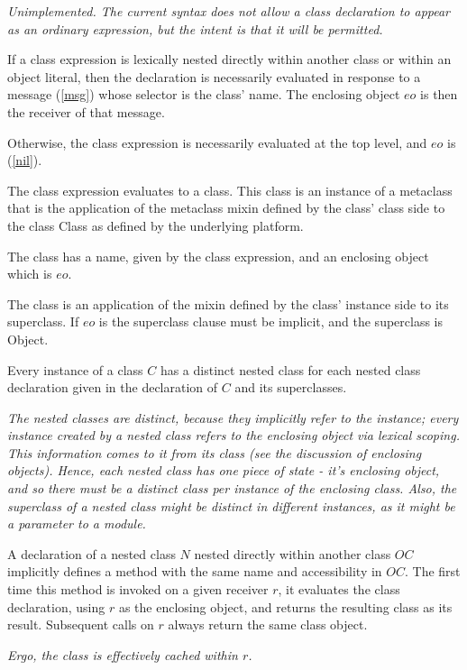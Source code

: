 \documentclass{article}
\newcommand{\code}[1]{{\sf #1}}
\begin{document}
 {\it Unimplemented. The current syntax does not allow a class declaration to appear as an ordinary expression, but the intent is that it will be permitted.
 }
 
If a class expression is lexically nested directly within another class or within an object literal, then the declaration is necessarily evaluated in response to a message (\ref{msg}) whose selector is the class' name. The enclosing object  $eo$ is then the receiver of that message.

Otherwise, the class expression is necessarily evaluated at the top level, and $eo$ is \NIL{}  (\ref{nil}).
 
The class expression evaluates to a class. This class is an instance of a metaclass that is the application of the metaclass mixin defined by the class' class side to the class \code{Class} as defined by the underlying platform. 

The class has a name, given by the  class expression, and an enclosing object which is $eo$. 
 
The class is an application of the mixin defined by the class' instance side to its superclass.
If $eo$ is \NIL{} the superclass clause must be implicit, and the superclass is \code{Object}.

Every instance of a class $C$ has a distinct nested class for each nested class declaration
given in the declaration of $C$ and its superclasses.

{\it The nested classes are distinct, because they implicitly refer to the instance; every instance created
 by a nested class refers to the enclosing object via lexical scoping.  This information comes
 to it from its class (see the discussion of enclosing objects). Hence, each nested class has
 one piece of state - it's enclosing object,  and so there must be a distinct class per instance
 of the enclosing class. 
 Also, the superclass of a nested class might be distinct in different instances, as it might be a parameter to a module. 
 }

A declaration of a nested class $N$ nested directly within another class $OC$ implicitly defines a method with the same name and accessibility in $OC$. The first time this method is invoked on a given receiver $r$, it evaluates the class declaration, using $r$ as the enclosing object, and returns the resulting class as its result. Subsequent calls on $r$ always return the same class object.

{\it 
Ergo, the class is effectively cached within $r$.
}
\end{document}
